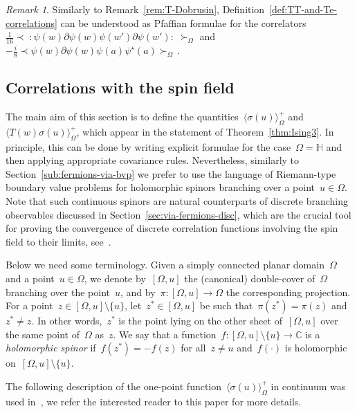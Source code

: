 \documentclass[reqno,11pt,a4paper]{amsart}
\theoremstyle{remark}
\newtheorem{remark}[proposition]{Remark}
\newcommand{\C}{\mathbb{C}}
\renewcommand{\H}{\mathbb{H}}
\newcommand{\OmegaU}{{[\Omega,u]}}
\newcommand\opsi{\psi^\star}
\newcommand\Corr[1]{\langle #1 \rangle}
\newcommand\CorrO[2][+]{\Corr{#2}_\Omega^{#1}}
\newcommand\CorrFerm[2]{\prec\! #2 \!\succ_{#1}{}}
\begin{document}
\begin{remark}\label{rem:TT-and-Te-Pfaff}
Similarly to Remark~\ref{rem:T-Dobrusin}, Definition~\ref{def:TT-and-Te-correlations} can be understood as Pfaffian formulae for the correlators~$\frac{1}{16}\!\CorrFerm{\Omega}{\;:\!\psi(w)\partial\psi(w)\psi(w')\partial\psi(w')\!:\;}$ and~$-\frac{i}{8}\!\CorrFerm{\Omega}{\psi(w)\partial\psi(w)\psi(a)\opsi(a)}$\,.
\end{remark}

\subsection{Correlations with the spin field} \label{sub:T-spin-correlations}
The main aim of this section is to define the quantities~$\CorrO{\sigma(u)}$ and~$\CorrO{T(w)\sigma(u)}$, which appear in the statement of Theorem~\ref{thm:Ising3}. In principle, this can be done by writing explicit formulae for the case~$\Omega=\H$ and then applying appropriate covariance rules. Nevertheless, similarly to Section~\ref{sub:fermions-via-bvp} we prefer to use the language of Riemann-type boundary value problems for holomorphic spinors branching over a point~$u\in\Omega$. Note that such continuous spinors are natural counterparts of discrete branching observables discussed in Section~\ref{sec:via-fermions-disc}, which are the crucial tool for proving the convergence of discrete correlation functions involving the spin field to their limits, see~\cite{CheIzy13,CheHonIzy15}.

Below we need some terminology. Given a simply connected planar domain~$\Omega$ and a point~$u\in\Omega$, we denote by~$\OmegaU$ the (canonical) double-cover of~$\Omega$ branching over the point~$u$, and by~$\pi:\OmegaU\to\Omega$ the corresponding projection. For a point~$z\in\OmegaU\setminus\{u\}$, let~$z^*\in\OmegaU$ be such that~$\pi(z^*)=\pi(z)$ and~$z^*\ne z$. In other words,~$z^*$ is the point lying on the other sheet of~$\OmegaU$ over the same point of~$\Omega$ as~$z$.
We say that a function~$f:\OmegaU\setminus\{u\}\to\C$ is a \emph{holomorphic spinor} if~$f(z^*)=-f(z)$ for all~$z\neq u$ and~$f(\cdot)$ is  holomorphic on~$\OmegaU\setminus\{u\}$.

The following description of the one-point function~$\CorrO{\sigma(u)}$ in continuum was used in~\cite{CheHonIzy15}, we refer the interested reader to this paper for more details.
\end{document}
